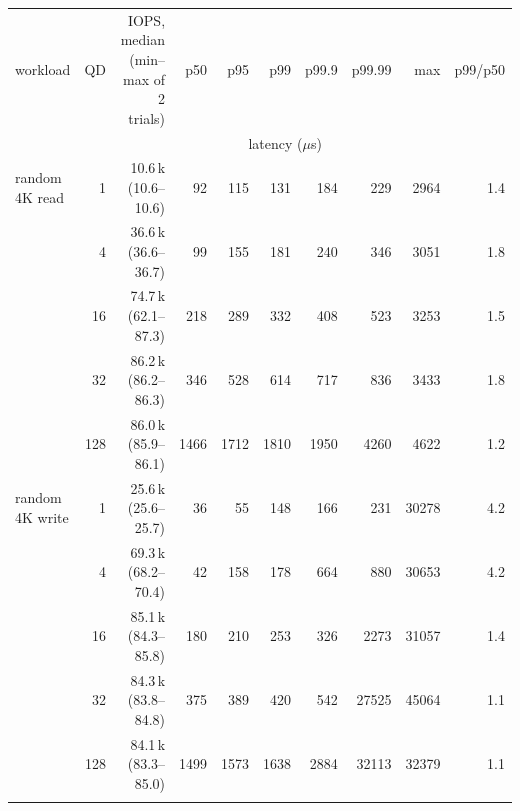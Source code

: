 \begin{tabular}{lrrrrrrrrr}
\toprule
workload & QD & IOPS, median (min--max of 2 trials) & p50 & p95 & p99 & p99.9 & p99.99 & max & p99/p50 \\
 & & & \multicolumn{5}{c}{latency ($\mu$s)} & & \\
\midrule
random 4K read & 1 & 10.6\,k (10.6--10.6) & 92 & 115 & 131 & 184 & 229 & 2964 & 1.4 \\
 & 4 & 36.6\,k (36.6--36.7) & 99 & 155 & 181 & 240 & 346 & 3051 & 1.8 \\
 & 16 & 74.7\,k (62.1--87.3) & 218 & 289 & 332 & 408 & 523 & 3253 & 1.5 \\
 & 32 & 86.2\,k (86.2--86.3) & 346 & 528 & 614 & 717 & 836 & 3433 & 1.8 \\
 & 128 & 86.0\,k (85.9--86.1) & 1466 & 1712 & 1810 & 1950 & 4260 & 4622 & 1.2 \\
\addlinespace
random 4K write & 1 & 25.6\,k (25.6--25.7) & 36 & 55 & 148 & 166 & 231 & 30278 & 4.2 \\
 & 4 & 69.3\,k (68.2--70.4) & 42 & 158 & 178 & 664 & 880 & 30653 & 4.2 \\
 & 16 & 85.1\,k (84.3--85.8) & 180 & 210 & 253 & 326 & 2273 & 31057 & 1.4 \\
 & 32 & 84.3\,k (83.8--84.8) & 375 & 389 & 420 & 542 & 27525 & 45064 & 1.1 \\
 & 128 & 84.1\,k (83.3--85.0) & 1499 & 1573 & 1638 & 2884 & 32113 & 32379 & 1.1 \\
\addlinespace
\bottomrule
\end{tabular}
